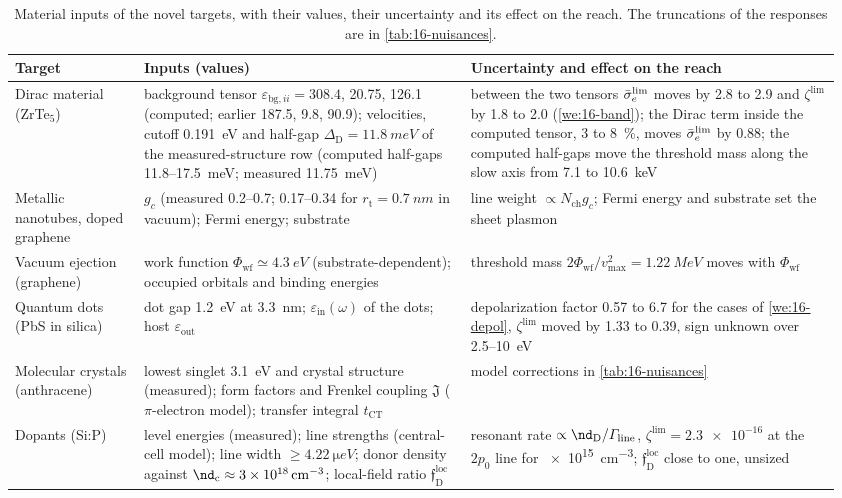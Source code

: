 \begin{table}[tbp]
  \caption{Material inputs of the novel targets, with their values, their uncertainty and its effect on the reach. The truncations of the responses are in \cref{tab:16-nuisances}.}
  \label{tab:16-inputs}
  \centering\scriptsize\setlength{\tabcolsep}{3pt}
  \begin{tabular}{@{}>{\raggedright\arraybackslash}p{0.15\linewidth}>{\raggedright\arraybackslash}p{0.38\linewidth}>{\raggedright\arraybackslash}p{0.43\linewidth}@{}}
    \toprule
    Target & Inputs (values) & Uncertainty and effect on the reach \\
    \midrule
    Dirac material (ZrTe$_5$) & background tensor $\varepsilon_{\mathrm{bg},ii} = 308.4$, 20.75, 126.1 (computed; earlier 187.5, 9.8, 90.9); velocities, cutoff \SI{0.191}{eV} and half-gap $\Delta_{\mathrm{D}} = \SI{11.8}{meV}$ of the measured-structure row (computed half-gaps 11.8--\SI{17.5}{meV}; measured \SI{11.75}{meV}) & between the two tensors $\bar{\sigma}_{e}^{\mathrm{lim}}$ moves by 2.8 to 2.9 and $\zeta^{\mathrm{lim}}$ by 1.8 to 2.0 (\cref{we:16-band}); the Dirac term inside the computed tensor, 3 to \SI{8}{\percent}, moves $\bar{\sigma}_{e}^{\mathrm{lim}}$ by 0.88; the computed half-gaps move the threshold mass along the slow axis from 7.1 to \SI{10.6}{keV} \\
    Metallic nanotubes, doped graphene & $g_c$ (measured 0.2--0.7; 0.17--0.34 for $r_{\mathrm{t}} = \SI{0.7}{nm}$ in vacuum); Fermi energy; substrate & line weight $\propto N_{\mathrm{ch}}g_c$; Fermi energy and substrate set the sheet plasmon \\
    Vacuum ejection (graphene) & work function $\Phi_{\mathrm{wf}} \simeq \SI{4.3}{eV}$ (substrate-dependent); occupied orbitals and binding energies & threshold mass $2\Phi_{\mathrm{wf}}/v_{\mathrm{max}}^2 = \SI{1.22}{MeV}$ moves with $\Phi_{\mathrm{wf}}$ \\
    Quantum dots (PbS in silica) & dot gap \SI{1.2}{eV} at \SI{3.3}{nm}; $\varepsilon_{\mathrm{in}}(\omega)$ of the dots; host $\varepsilon_{\mathrm{out}}$ & depolarization factor 0.57 to 6.7 for the cases of \cref{we:16-depol}, $\zeta^{\mathrm{lim}}$ moved by 1.33 to 0.39, sign unknown over 2.5--\SI{10}{eV} \\
    Molecular crystals (anthracene) & lowest singlet \SI{3.1}{eV} and crystal structure (measured); form factors and Frenkel coupling $\mathfrak{J}$ ($\pi$-electron model); transfer integral $t_{\mathrm{CT}}$ & model corrections in \cref{tab:16-nuisances} \\
    Dopants (Si:P) & level energies (measured); line strengths (central-cell model); line width $\ge \SI{4.22}{\micro eV}$; donor density against $\nd_{\mathrm{c}} \approx \SI{3e18}{cm^{-3}}$; local-field ratio $\mathfrak{f}^{\mathrm{loc}}_{\mathrm{D}}$ & resonant rate $\propto \nd_{\mathrm{D}}/\varGamma_{\mathrm{line}}$, $\zeta^{\mathrm{lim}} = \num{2.3e-16}$ at the $2p_0$ line for \SI{e15}{cm^{-3}}; $\mathfrak{f}^{\mathrm{loc}}_{\mathrm{D}}$ close to one, unsized \\

\end{tabular}
\end{table}
